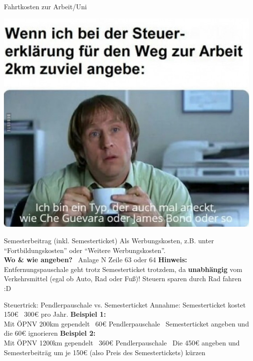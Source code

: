 \documentclass{beamer}
\begin{document}
			\begin{frame}{Fahrtkosten zur Arbeit/Uni}
				\begin{center}
					\includegraphics[height=0.85\textheight]{images/meme-fahrtkosten.jpg}
				\end{center}
			\end{frame}
		
			\begin{frame}{Semesterbeitrag (inkl. Semesterticket)}
				Als Werbungskosten, z.B. unter "`Fortbildungskosten"' oder "`Weitere Werbungskosten"'.\n
				\hfill\\\pause
				\textbf{Wo \& wie angeben?} \textrightarrow\ Anlage N Zeile 63 oder 64\n\pause
				\textbf{Hinweis:} Entfernungspauschale geht trotz Semesterticket trotzdem, da \textbf{unabhängig} vom Verkehrsmittel (egal ob Auto, Rad oder Fuß)! Steuern sparen durch Rad fahren :D
			\end{frame}
		
			\begin{frame}{Steuertrick: Pendlerpauschale vs. Semesterticket}
				Annahme: Semesterticket kostet 150€ \textrightarrow\ 300€ pro Jahr.\n
				\textbf{Beispiel 1:}\\
				Mit ÖPNV 200km gependelt \textrightarrow\ 60€ Pendlerpauschale \textrightarrow\ Semesterticket angeben und die 60€ ignorieren\n
				\textbf{Beispiel 2:}\\
				Mit ÖPNV 1200km gependelt \textrightarrow\ 360€ Pendlerpauschale \textrightarrow\ Die 450€ angeben und Semesterbeiträg um je 150€ (also Preis des Semestertickets) kürzen
			\end{frame}
		
\end{document}
